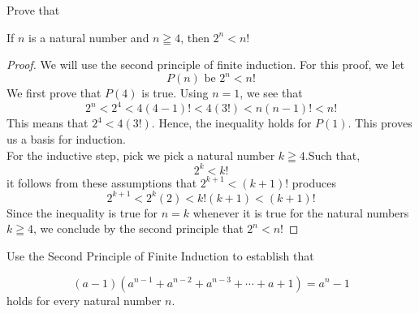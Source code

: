 \newpage
\begin{example}
Prove that
\begin{tcolorbox}
    \begin{theorem}
        If $n$ is a natural number and $n \geqq 4$, then $2^n < n!$
    \end{theorem}
\end{tcolorbox}

\begin{proof}
         We will use the second principle of finite induction. For this proof, we let
            \begin{equation*}
                P(n) \text{ be } 2^n < n!          
            \end{equation*}
        We first prove that $P(4)$ is true. Using $n=1$, we see that
            \begin{equation*}
                2^n < 2^4 < 4(4-1)! < 4(3!) < n(n-1)!< n!
            \end{equation*}
        This means that $2^4 < 4(3!)$. Hence, the inequality holds for $P(1)$. This proves us a basis for induction. \\ 
        For the inductive step, pick we pick a natural number $k \geqq 4$.Such that, 
            \begin{equation*}
                2^k < k!
            \end{equation*}
        it follows from these assumptions that $2^{k+1} < (k+1)!$ produces 
            \begin{equation*}
                2^{k+1} < 2^k(2) < k!(k+1) < (k+1)!
            \end{equation*}
        Since the inequality is true for $n=k$ whenever it is true for the natural numbers $k \geqq 4$, we conclude by the second principle that $2^n < n!$
\end{proof}
\end{example}





\newpage
\begin{example}
Use the Second Principle of Finite Induction to establish that

\begin{tcolorbox}
    \begin{theorem}
        \begin{equation*}
            (a-1)(a^{n-1} + a^{n-2} + a^{n-3} + \cdots + a + 1) = a^n - 1
        \end{equation*}
        holds for every natural number $n$. 
    \end{theorem}
\end{tcolorbox}

\end{example}

